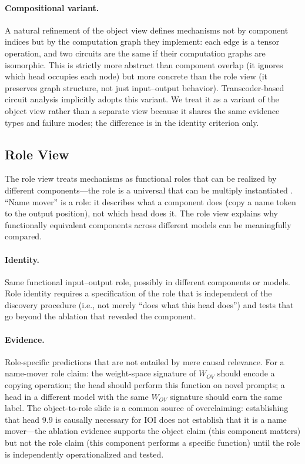 \documentclass{article}
\begin{document}
\paragraph{Compositional variant.}
A natural refinement of the object view defines mechanisms not by
component indices but by the computation graph they implement: each edge
is a tensor operation, and two circuits are the same if their
computation graphs are isomorphic.  This is strictly more
abstract than component overlap (it ignores which head occupies each
node) but more concrete than the role view (it preserves graph
structure, not just input--output behavior).  Transcoder-based
circuit analysis implicitly adopts this variant.  We treat it as a
variant of the object view rather than a separate view because it
shares the same evidence types and failure modes; the difference is
in the identity criterion only.

\subsection{Role View}

The role view treats mechanisms as functional roles that can be realized
by different components---the role is a universal that can be multiply
instantiated \citep{lewis1972}.  ``Name mover'' is a role: it describes
what a component does (copy a name token to the output position), not
which head does it.  The role view explains why functionally equivalent
components across different models can be meaningfully compared.

\paragraph{Identity.}
Same functional input--output role, possibly in different components or
models.  Role identity requires a specification of the role that is
independent of the discovery procedure (i.e., not merely ``does what
this head does'') and tests that go beyond the ablation that revealed
the component.

\paragraph{Evidence.}
Role-specific predictions that are not entailed by mere causal relevance.
For a name-mover role claim: the weight-space signature of $W_{OV}$
should encode a copying operation; the head should perform this function
on novel prompts; a head in a different model with the same $W_{OV}$
signature should earn the same label.  The object-to-role slide is
a common source of overclaiming: establishing
that head 9.9 is causally necessary for IOI does not establish that it
is a name mover---the ablation evidence supports the object claim
(this component matters) but not the role claim (this component performs
a specific function) until the role is independently operationalized
and tested.
\end{document}
